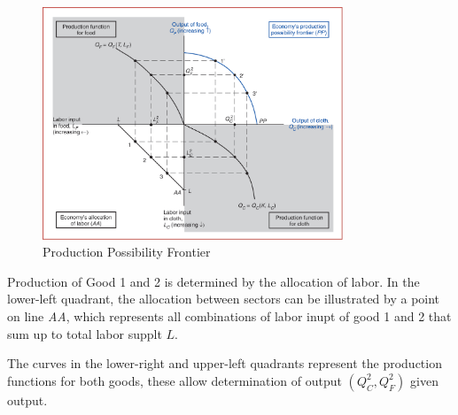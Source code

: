 \begin{figure}[htbp!]
    \centering
    \includegraphics[width=0.8\textwidth]{figures/SFM_PPF.png}
    \caption{Production Possibility Frontier}
    \label{fig:lec4-1}
\end{figure}


Production of Good 1 and 2 is determined by the allocation of labor.
In the lower-left quadrant, the allocation between sectors can be illustrated by a point on line \textit{AA},
which represents all combinations of labor inupt of good 1 and 2 that sum up to total labor supplt $L$.

The curves in the lower-right and upper-left quadrants represent the production functions for both goods,
these allow determination of output $(Q_C^2, Q_F^2)$ given output.